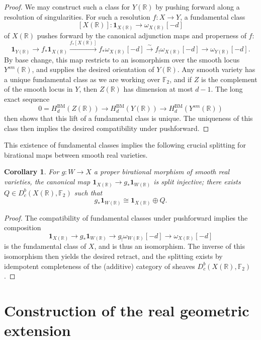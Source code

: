 \documentclass{amsart}
\newtheorem{cor}[thm]{Corollary}
\theoremstyle{definition}
\theoremstyle{remark}
\begin{document}
\begin{proof}
We may construct such a class for $Y(\mathbb{R})$ by pushing forward along a resolution of singularities. For such a resolution $f:X\to Y$, a fundamental class \[[X(\mathbb{R})]:\mathbf{1}_{X(\mathbb{R})}\to \omega_{X(\mathbb{R})}[-d]\] of $X(\mathbb{R})$ pushes forward by the canonical adjunction maps and properness of $f$:\[\mathbf{1}_{Y(\mathbb{R})}\to f_*\mathbf{1}_{X(\mathbb{R})}\xrightarrow{f_*[X(\mathbb{R})]}f_* \omega_{X(\mathbb{R})}[-d]\xrightarrow{\sim} f_! \omega_{X(\mathbb{R})}[-d]\to  \omega_{Y(\mathbb{R})}[-d].\]
By base change, this map restricts to an isomorphism over the smooth locus $Y^{sm}(\mathbb{R})$, and supplies the desired orientation of $Y(\mathbb{R})$. Any smooth variety has a unique fundamental class as we are working over $\mathbb{F}_2$, and if $Z$ is the complement of the smooth locus in $Y$, then $Z(\mathbb{R})$ has dimension at most $d-1$. The long exact sequence \[0=H_d^{\mathrm{BM}}(Z(\mathbb{R}))\to H_d^{\mathrm{BM}}(Y(\mathbb{R}))\to H_d^{\mathrm{BM}}(Y^{sm}(\mathbb{R}))\] then shows that this lift of a fundamental class is unique. The uniqueness of this class then implies the desired compatibility under pushforward.
\end{proof}


This existence of fundamental classes implies the following crucial splitting for birational maps between smooth real varieties.

\begin{cor}\label{Cor:Splitting}
For $g:W\to X$ a proper birational morphism of smooth real varieties, the canonical map $\mathbf{1}_{X(\mathbb{R})}\to g_*\mathbf{1}_{W(\mathbb{R})}$ is split injective; there exists $Q\in D^b_c(X(\mathbb{R}),\mathbb{F}_2)$ such that \[g_*\mathbf{1}_{W(\mathbb{R})}\cong \mathbf{1}_{X(\mathbb{R})}\oplus Q.\]
\end{cor}

\begin{proof}
The compatibility of fundamental classes under pushforward implies the composition \[\mathbf{1}_{X(\mathbb{R})}\to g_*\mathbf{1}_{W(\mathbb{R})}\to g_!\omega_{W(\mathbb{R})}[-d]\to \omega_{X(\mathbb{R})}[-d]\] is the fundamental class of $X$, and is thus an isomorphism. The inverse of this isomorphism then yields the desired retract, and the splitting exists by idempotent completeness of the (additive) category of sheaves $D^b_c(X(\mathbb{R}),\mathbb{F}_2)$.
\end{proof}
\section{Construction of the real geometric extension}\label{Sec:Construction}
\end{document}
